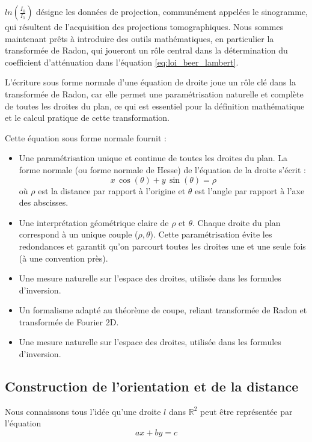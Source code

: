 $ln(\frac{I_0}{I_1})$ désigne les données de projection, communément appelées le sinogramme, qui résultent de l'acquisition des projections tomographiques.
\medskip
\noindent
Nous sommes maintenant prêts à introduire des outils mathématiques, en particulier la transformée de Radon, qui joueront un rôle central dans la détermination du coefficient d'atténuation dans l'équation \eqref{eq:loi_beer_lambert}.

L'écriture sous forme normale d'une équation de droite joue un rôle clé dans la transformée de Radon, car elle permet une paramétrisation naturelle et complète de toutes les droites du plan, ce qui est essentiel pour la définition mathématique et le calcul pratique de cette transformation.

Cette équation sous forme normale fournit :
\begin{itemize}
    \item[(i)] Une paramétrisation unique et continue de toutes les droites du plan. La forme normale (ou forme normale de Hesse) de l'équation de la droite s'écrit : 
    \begin{equation}x\,\cos(\theta)+y\,\sin(\theta)=\rho \end{equation}
    où $\rho$ est la distance par rapport à l'origine et $\theta$ est l'angle par rapport à l'axe des abscisses.
    \item[(ii)] Une interprétation géométrique claire de $\rho$ et $\theta$. Chaque droite du plan correspond  à un unique couple ($\rho,\theta$). Cette paramétrisation évite les redondances et garantit qu'on parcourt toutes les droites une et une seule fois (à une convention près).
    \item[(iii)] Une mesure naturelle sur l'espace des droites, utilisée dans les formules d'inversion.
    \item[(iv)] Un formalisme adapté au théorème de coupe, reliant transformée de Radon et transformée de Fourier 2D. 
    \item[(v)] Une mesure naturelle sur l'espace des droites, utilisée dans les formules d'inversion.
\end{itemize}
\subsection{\small Construction de l'orientation et de la distance}
Nous connaissons tous l'idée qu'une droite \( l \) dans \( \mathbb{R}^2 \) peut être représentée par l'équation 
\begin{equation}
ax + by = c
\end{equation}

